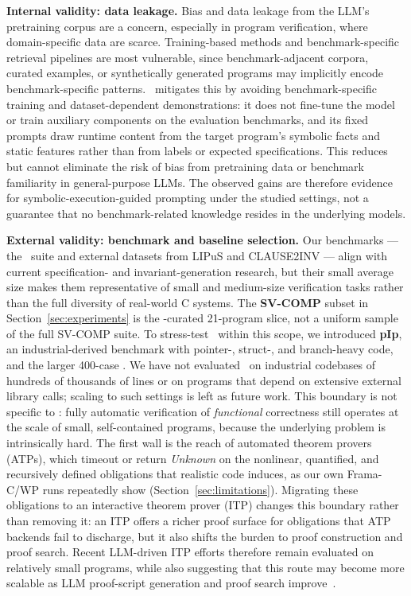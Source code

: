 \smallskip
\noindent\textbf{Internal validity: data leakage.}
Bias and data leakage from the LLM's pretraining corpus are a concern,
especially in program verification, where domain-specific data are scarce.
Training-based methods and benchmark-specific retrieval pipelines are most
vulnerable, since benchmark-adjacent corpora, curated examples, or synthetically
generated programs may implicitly encode benchmark-specific patterns.
\toolname\ mitigates this by avoiding benchmark-specific training and
dataset-dependent demonstrations: it does not fine-tune the model or train
auxiliary components on the evaluation benchmarks, and its fixed prompts draw
runtime content from the target program's symbolic facts and static features
rather than from labels or expected specifications. This reduces but cannot
eliminate the risk of bias from pretraining data or benchmark familiarity in
general-purpose LLMs. The observed gains are therefore evidence for
symbolic-execution-guided prompting under the studied settings, not a guarantee
that no benchmark-related knowledge resides in the underlying models.

\smallskip
\noindent\textbf{External validity: benchmark and baseline selection.}
Our benchmarks --- the \autospec\ suite and external datasets from LIPuS and
CLAUSE2INV --- align with current specification- and invariant-generation
research, but their small average size makes them representative of small and
medium-size verification tasks rather than the full diversity of real-world C
systems. The \textbf{SV-COMP} subset in Section~\ref{sec:experiments} is the
\autospec-curated 21-program slice, not a uniform sample of the full SV-COMP
suite. To stress-test \toolname\ within this scope, we introduced \textbf{pIp},
an industrial-derived benchmark with pointer-, struct-, and branch-heavy code,
and the larger 400-case \textbf{}. We have not evaluated \toolname\ on
industrial codebases of hundreds of thousands of lines or on programs that
depend on extensive external library calls; scaling to such settings is left as
future work. This boundary is not specific to \toolname: fully automatic
verification of \emph{functional} correctness still operates at the scale of
small, self-contained programs, because the underlying problem is intrinsically
hard. The first wall is the reach of automated theorem provers (ATPs), which
timeout or return \emph{Unknown} on the nonlinear, quantified, and recursively
defined obligations that realistic code induces, as our own Frama-C/WP runs
repeatedly show (Section~\ref{sec:limitations}). Migrating these obligations to
an interactive theorem prover (ITP) changes this boundary rather than removing
it: an ITP offers a richer proof surface for obligations that ATP backends fail
to discharge, but it also shifts the burden to proof construction and proof
search. Recent LLM-driven ITP efforts therefore remain evaluated on relatively
small programs, while also suggesting that this route may become more scalable
as LLM proof-script generation and proof search improve~\cite{yang2026how,thakur2025clever,ye2026verina,li2026goedelcodeproverhierarchicalproofsearch}.

